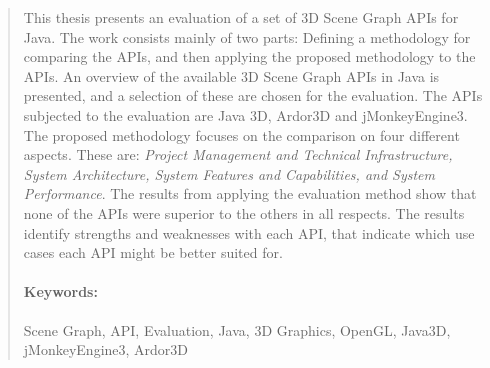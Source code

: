 \begin{quotation}
\noindent  This thesis presents an evaluation of a set of 3D Scene Graph APIs for Java. The work consists mainly of two parts: Defining a methodology for comparing the APIs, and then applying the proposed methodology to the APIs.
An overview of the available 3D Scene Graph APIs in Java is presented, and a selection of these are chosen for the evaluation. The APIs subjected to the evaluation are Java 3D, Ardor3D and jMonkeyEngine3.
The proposed methodology focuses on the comparison on four different aspects. These are: \textit{Project Management and Technical Infrastructure, System Architecture, System Features and Capabilities, and System Performance}.
The results from applying the evaluation method show that none of the APIs were superior to the others in all respects. The results identify strengths and weaknesses with each API, that indicate which use cases each API might be better suited for.
\newline 
\paragraph{Keywords:} Scene Graph, API, Evaluation, Java, 3D Graphics, OpenGL, Java3D, jMonkeyEngine3, Ardor3D
\end{quotation}


